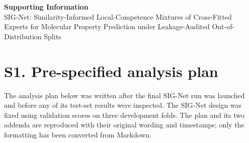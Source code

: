 \documentclass[11pt]{article}
\begin{document}
\begin{center}{\Large\bfseries Supporting Information}\\[4pt]
SIG-Net: Similarity-Informed Local-Competence Mixtures of Cross-Fitted Experts for Molecular Property Prediction under Leakage-Audited Out-of-Distribution Splits\end{center}

\section*{S1. Pre-specified analysis plan}
The analysis plan below was written after the final SIG-Net run was launched and before any of its test-set results were inspected. The SIG-Net design was fixed using validation scores on three development folds. The plan and its two addenda are reproduced with their original wording and timestamps; only the formatting has been converted from Markdown.
\end{document}
